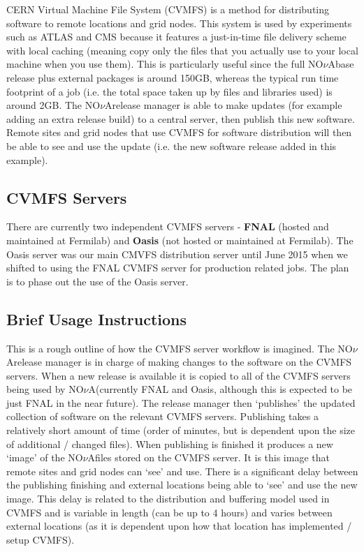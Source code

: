 \documentclass[letterpaper,10pt]{article}
\newcommand{\nova}{NO$\nu$A}
\newcommand{\novas}{\nova \space}
\begin{document}
CERN Virtual Machine File System (CVMFS) is a method for distributing software to remote locations and grid nodes. This system is used by experiments such as ATLAS and CMS because it features a just-in-time file delivery scheme with local caching (meaning copy only the files that you actually use to your local machine when you use them). This is particularly useful since the full \novas base release plus external packages is around 150GB, whereas the typical run time footprint of a job (i.e. the total space taken up by files and libraries used) is around 2GB.
\noindent
The \nova release manager is able to make updates (for example adding an extra release build) to a central server, then publish this new software. Remote sites and grid nodes that use CVMFS for software distribution will then be able to see and use the update (i.e. the new software release added in this example).

\subsection{CVMFS Servers}

There are currently two independent CVMFS servers - \textbf{FNAL} (hosted and maintained at Fermilab) and \textbf{Oasis} (not hosted or maintained at Fermilab). The Oasis server was our main CMVFS distribution server until June 2015 when we shifted to using the FNAL CVMFS server for production related jobs. The plan is to phase out the use of the Oasis server. 

\subsection{Brief Usage Instructions}

This is a rough outline of how the CVMFS server workflow is imagined. The \novas release manager is in charge of making changes to the software on the CVMFS servers. When a new release is available it is copied to all of the CVMFS servers being used by \novas (currently FNAL and Oasis, although this is expected to be just FNAL in the near future). The release manager then `publishes' the updated collection of software on the relevant CVMFS servers. Publishing takes a relatively short amount of time (order of minutes, but is dependent upon the size of additional / changed files). When publishing is finished it produces a new `image' of the \novas files stored on the CVMFS server. It is this image that remote sites and grid nodes can `see' and use. There is a significant delay between the publishing finishing and external locations being able to `see' and use the new image. This delay is related to the distribution and buffering model used in CVMFS and is variable in length (can be up to 4 hours) and varies between external locations (as it is dependent upon how that location has implemented / setup CVMFS).
\end{document}
